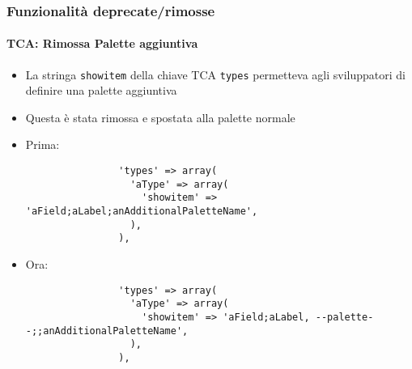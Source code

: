 \begin{frame}[fragile]
	\frametitle{Funzionalità deprecate/rimosse}
	\framesubtitle{TCA: Rimossa Palette aggiuntiva}

	\lstset{basicstyle=\tiny\ttfamily}

	\begin{itemize}

		\item La stringa \texttt{showitem} della chiave TCA \texttt{types} permetteva agli sviluppatori di definire
			una palette aggiuntiva

		\item Questa è stata rimossa e spostata alla palette normale

		\item Prima:

			\begin{lstlisting}
				'types' => array(
				  'aType' => array(
				    'showitem' => 'aField;aLabel;anAdditionalPaletteName',
				  ),
				),
			\end{lstlisting}

		\item Ora:

			\begin{lstlisting}
				'types' => array(
				  'aType' => array(
				    'showitem' => 'aField;aLabel, --palette--;;anAdditionalPaletteName',
				  ),
				),
			\end{lstlisting}

	\end{itemize}

\end{frame}


